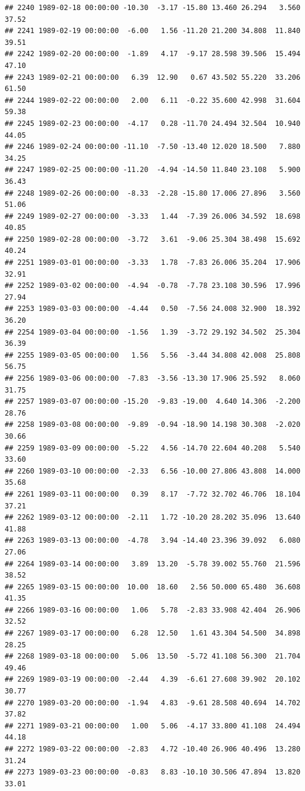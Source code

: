 \documentclass{article}\usepackage{graphicx, color}
\makeatletter
\newenvironment{kframe}{%
 \def\at@end@of@kframe{}%
 \ifinner\ifhmode%
  \def\at@end@of@kframe{\end{minipage}}%
  \begin{minipage}{\columnwidth}%
 \fi\fi%
 \def\FrameCommand##1{\hskip\@totalleftmargin \hskip-\fboxsep
 \colorbox{shadecolor}{##1}\hskip-\fboxsep
     \hskip-\linewidth \hskip-\@totalleftmargin \hskip\columnwidth}%
 \MakeFramed {\advance\hsize-\width
   \@totalleftmargin\z@ \linewidth\hsize
   \@setminipage}}%
 {\par\unskip\endMakeFramed%
 \at@end@of@kframe}
\newenvironment{knitrout}{}{} %
\makeatother
\begin{document}
\begin{knitrout}
\begin{kframe}
\begin{verbatim}
## 2240 1989-02-18 00:00:00 -10.30  -3.17 -15.80 13.460 26.294   3.560  37.52
## 2241 1989-02-19 00:00:00  -6.00   1.56 -11.20 21.200 34.808  11.840  39.51
## 2242 1989-02-20 00:00:00  -1.89   4.17  -9.17 28.598 39.506  15.494  47.10
## 2243 1989-02-21 00:00:00   6.39  12.90   0.67 43.502 55.220  33.206  61.50
## 2244 1989-02-22 00:00:00   2.00   6.11  -0.22 35.600 42.998  31.604  59.38
## 2245 1989-02-23 00:00:00  -4.17   0.28 -11.70 24.494 32.504  10.940  44.05
## 2246 1989-02-24 00:00:00 -11.10  -7.50 -13.40 12.020 18.500   7.880  34.25
## 2247 1989-02-25 00:00:00 -11.20  -4.94 -14.50 11.840 23.108   5.900  36.43
## 2248 1989-02-26 00:00:00  -8.33  -2.28 -15.80 17.006 27.896   3.560  51.06
## 2249 1989-02-27 00:00:00  -3.33   1.44  -7.39 26.006 34.592  18.698  40.85
## 2250 1989-02-28 00:00:00  -3.72   3.61  -9.06 25.304 38.498  15.692  40.24
## 2251 1989-03-01 00:00:00  -3.33   1.78  -7.83 26.006 35.204  17.906  32.91
## 2252 1989-03-02 00:00:00  -4.94  -0.78  -7.78 23.108 30.596  17.996  27.94
## 2253 1989-03-03 00:00:00  -4.44   0.50  -7.56 24.008 32.900  18.392  36.20
## 2254 1989-03-04 00:00:00  -1.56   1.39  -3.72 29.192 34.502  25.304  36.39
## 2255 1989-03-05 00:00:00   1.56   5.56  -3.44 34.808 42.008  25.808  56.75
## 2256 1989-03-06 00:00:00  -7.83  -3.56 -13.30 17.906 25.592   8.060  31.75
## 2257 1989-03-07 00:00:00 -15.20  -9.83 -19.00  4.640 14.306  -2.200  28.76
## 2258 1989-03-08 00:00:00  -9.89  -0.94 -18.90 14.198 30.308  -2.020  30.66
## 2259 1989-03-09 00:00:00  -5.22   4.56 -14.70 22.604 40.208   5.540  33.60
## 2260 1989-03-10 00:00:00  -2.33   6.56 -10.00 27.806 43.808  14.000  35.68
## 2261 1989-03-11 00:00:00   0.39   8.17  -7.72 32.702 46.706  18.104  37.21
## 2262 1989-03-12 00:00:00  -2.11   1.72 -10.20 28.202 35.096  13.640  41.88
## 2263 1989-03-13 00:00:00  -4.78   3.94 -14.40 23.396 39.092   6.080  27.06
## 2264 1989-03-14 00:00:00   3.89  13.20  -5.78 39.002 55.760  21.596  38.52
## 2265 1989-03-15 00:00:00  10.00  18.60   2.56 50.000 65.480  36.608  41.35
## 2266 1989-03-16 00:00:00   1.06   5.78  -2.83 33.908 42.404  26.906  32.52
## 2267 1989-03-17 00:00:00   6.28  12.50   1.61 43.304 54.500  34.898  28.25
## 2268 1989-03-18 00:00:00   5.06  13.50  -5.72 41.108 56.300  21.704  49.46
## 2269 1989-03-19 00:00:00  -2.44   4.39  -6.61 27.608 39.902  20.102  30.77
## 2270 1989-03-20 00:00:00  -1.94   4.83  -9.61 28.508 40.694  14.702  37.82
## 2271 1989-03-21 00:00:00   1.00   5.06  -4.17 33.800 41.108  24.494  44.18
## 2272 1989-03-22 00:00:00  -2.83   4.72 -10.40 26.906 40.496  13.280  31.24
## 2273 1989-03-23 00:00:00  -0.83   8.83 -10.10 30.506 47.894  13.820  33.01

\end{verbatim}
\end{kframe}
\end{knitrout}
\end{document}

